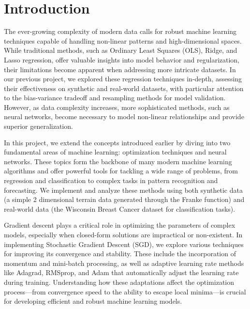 \documentclass[aps,pra,english,notitlepage,reprint,nofootinbib]{revtex4-1}  %
\begin{document}

\section{Introduction}\label{sec:introduction}

The ever-growing complexity of modern data calls for robust machine learning techniques capable of handling non-linear patterns and high-dimensional spaces. While traditional methods, such as Ordinary Least Squares (OLS), Ridge, and Lasso regression, offer valuable insights into model behavior and regularization, their limitations become apparent when addressing more intricate datasets. In our previous project, we explored these regression techniques in-depth, assessing their effectiveness on synthetic and real-world datasets, with particular attention to the bias-variance tradeoff and resampling methods for model validation. However, as data complexity increases, more sophisticated methods, such as neural networks, become necessary to model non-linear relationships and provide superior generalization.

In this project, we extend the concepts introduced earlier by diving into two fundamental areas of machine learning: optimization techniques and neural networks. These topics form the backbone of many modern machine learning algorithms and offer powerful tools for tackling a wide range of problems, from regression and classification to complex tasks in pattern recognition and forecasting. We implement and analyze these methods using both synthetic data (a simple 2 dimensional terrain data generated through the Franke function) and real-world data (the Wisconsin Breast Cancer dataset for classification tasks).

Gradient descent plays a critical role in optimizing the parameters of complex models, especially when closed-form solutions are impractical or non-existent. In implementing Stochastic Gradient Descent (SGD), we explore various techniques for improving its convergence and stability. These include the incorporation of momentum and mini-batch processing, as well as adaptive learning rate methods like Adagrad, RMSprop, and Adam that automatically adjust the learning rate during training. Understanding how these adaptations affect the optimization process—from convergence speed to the ability to escape local minima—is crucial for developing efficient and robust machine learning models.
\end{document}
